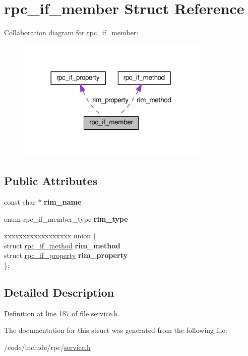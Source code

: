 \hypertarget{structrpc__if__member}{}\section{rpc\+\_\+if\+\_\+member Struct Reference}
\label{structrpc__if__member}


Collaboration diagram for rpc\+\_\+if\+\_\+member\+:
\nopagebreak
\begin{figure}[H]
\begin{center}
\leavevmode
\includegraphics[width=260pt]{structrpc__if__member__coll__graph}
\end{center}
\end{figure}
\subsection*{Public Attributes}
\begin{DoxyCompactItemize}
\item 
const char $\ast$ {\bfseries rim\+\_\+name}\hypertarget{structrpc__if__member_ad98804e4fe5438a8c5823c7623c6dab4}{}\label{structrpc__if__member_ad98804e4fe5438a8c5823c7623c6dab4}

\item 
enum rpc\+\_\+if\+\_\+member\+\_\+type {\bfseries rim\+\_\+type}\hypertarget{structrpc__if__member_a0ffdb5e81a707932149376d01c716b10}{}\label{structrpc__if__member_a0ffdb5e81a707932149376d01c716b10}

\item 
\begin{tabbing}
xx\=xx\=xx\=xx\=xx\=xx\=xx\=xx\=xx\=\kill
union \{\\
\>struct \hyperlink{structrpc__if__method}{rpc\_if\_method} {\bfseries rim\_method}\\
\>struct \hyperlink{structrpc__if__property}{rpc\_if\_property} {\bfseries rim\_property}\\
\}; \hypertarget{structrpc__if__member_a7c950b405b6852b3038ae847d0b7e2e0}{}\label{structrpc__if__member_a7c950b405b6852b3038ae847d0b7e2e0}
\\

\end{tabbing}\end{DoxyCompactItemize}


\subsection{Detailed Description}


Definition at line 187 of file service.\+h.



The documentation for this struct was generated from the following file\+:\begin{DoxyCompactItemize}
\item 
/code/include/rpc/\hyperlink{service_8h}{service.\+h}\end{DoxyCompactItemize}

